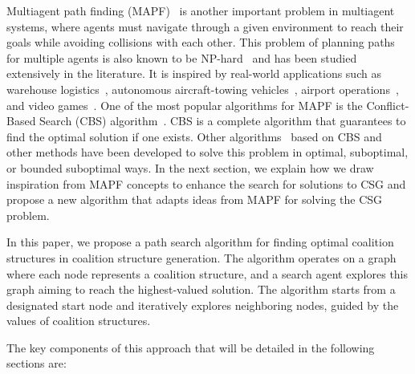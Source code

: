
Multiagent path finding (MAPF)~\cite{stern2019multi2} is another important problem in multiagent systems, where agents must navigate through a given environment to reach their goals while avoiding collisions with each other. This problem of planning paths for multiple agents is also known to be NP-hard~\cite{Yu_LaValle_2013} and has been studied extensively in the literature. It is inspired by real-world applications such as warehouse
logistics~\cite{Ma2017LifelongMP}, autonomous aircraft-towing vehicles~\cite{Morris2016PlanningSA}, airport operations~\cite{Li2019SchedulingAA}, and video games~\cite{li2020moving}. 
One of the most popular algorithms for MAPF is the Conflict-Based Search (CBS) algorithm~\cite{sharon2015conflict}. CBS is a complete algorithm that guarantees to find the optimal solution if one exists. Other algorithms~\cite{Gange_Harabor_Stuckey_2021,Barer2014SuboptimalVO,Li_Tinka_Kiesel_Durham_Kumar_Koenig_2021,li2021eecbs,Li_Gange_Harabor_Stuckey_Ma_Koenig_2020,Li2020EECBSAB} based on CBS and other methods have been developed to solve this problem in optimal, suboptimal, or bounded suboptimal ways. 
In the next section, we explain how we draw inspiration from MAPF concepts to enhance the search for solutions to CSG and propose a new algorithm that adapts ideas from MAPF for solving the CSG problem.

In this paper, we propose a path search algorithm for finding optimal coalition structures in coalition structure generation. The algorithm operates on a graph where each node represents a coalition structure, and a search agent explores this graph aiming to reach the highest-valued solution. The algorithm starts from a designated start node and iteratively explores neighboring nodes, guided by the values of coalition structures.

The key components of this approach that will be detailed in the following sections are:

